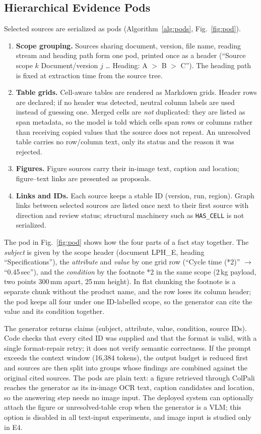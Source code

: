 \documentclass[runningheads]{llncs}
\begin{document}
\subsection{Hierarchical Evidence Pods}
Selected sources are serialized as pods (Algorithm~\ref{alg:pods}, Fig.~\ref{fig:pod}).
\begin{enumerate}
\item \textbf{Scope grouping.} Sources sharing document, version, file name, reading stream and heading path form one pod, printed once as a header (``Source scope $k$ \textbar{} Document/version $j$ \ldots{} Heading: A $>$ B $>$ C''). The heading path is fixed at extraction time from the source tree.
\item \textbf{Table grids.} Cell-aware tables are rendered as Markdown grids. Header rows are declared; if no header was detected, neutral column labels are used instead of guessing one. Merged cells are \emph{not} duplicated: they are listed as span metadata, so the model is told which cells span rows or columns rather than receiving copied values that the source does not repeat. An unresolved table carries no row/column text, only its status and the reason it was rejected.
\item \textbf{Figures.} Figure sources carry their in-image text, caption and location; figure--text links are presented as proposals.
\item \textbf{Links and IDs.} Each source keeps a stable ID (version, run, region). Graph links between selected sources are listed once next to their first source with direction and review status; structural machinery such as \texttt{HAS\_CELL} is not serialized.
\end{enumerate}
The pod in Fig.~\ref{fig:pod} shows how the four parts of a fact stay together. The \emph{subject} is given by the scope header (document LPH\_E, heading ``Specifications''), the \emph{attribute} and \emph{value} by one grid row (``Cycle time (*2)'' $\rightarrow$ ``0.45\,sec''), and the \emph{condition} by the footnote *2 in the same scope (2\,kg payload, two points 300\,mm apart, 25\,mm height). In flat chunking the footnote is a separate chunk without the product name, and the row loses its column header; the pod keeps all four under one ID-labelled scope, so the generator can cite the value and its condition together.

The generator returns claims (subject, attribute, value, condition, source IDs). Code checks that every cited ID was supplied and that the format is valid, with a single format-repair retry; it does not verify semantic correctness. If the prompt exceeds the context window (16{,}384 tokens), the output budget is reduced first and sources are then split into groups whose findings are combined against the original cited sources. The pods are plain text: a figure retrieved through ColPali reaches the generator as its in-image OCR text, caption candidates and location, so the answering step needs no image input. The deployed system can optionally attach the figure or unresolved-table crop when the generator is a VLM; this option is disabled in all text-input experiments, and image input is studied only in E4.
\end{document}

